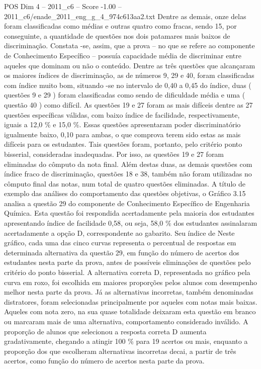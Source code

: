 \begin{textsample}{POS Dim 4 – 2011\_c6 – Score -1.00 – 2011\_c6/enade\_2011\_eng\_g\_4\_974c613aa2.txt}
Dentre as demais, onze delas foram classificadas como médias e outras quatro como fracas, sendo 15, por conseguinte, a quantidade de questões nos dois patamares mais baixos de discriminação.
Constata -se, assim, que a prova – no que se refere ao componente de Conhecimento Específico – possuía capacidade média de discriminar entre aqueles que dominam ou não o conteúdo.
Dentre as três questões que alcançaram os maiores índices de discriminação, as de números 9, 29 e 40, foram classificadas com índice muito bom, situando -se no intervalo de 0,40 a 0,45 do índice, duas ( questões 9 e 29 ) foram classificadas como sendo de dificuldade média e uma ( questão 40 ) como difícil.
As questões 19 e 27 foram as mais difíceis dentre as 27 questões específicas válidas, com baixo índice de facilidade, respectivamente, iguais a 12,0 \% e 15,0 \%.
Essas questões apresentaram poder discriminatório igualmente baixo, 0,10 para ambas, o que comprova terem sido estas as mais difíceis para os estudantes.
Tais questões foram, portanto, pelo critério ponto bisserial, consideradas inadequadas.
Por isso, as questões 19 e 27 foram eliminadas do cômputo da nota final.
Além destas duas, as demais questões com índice fraco de discriminação, questões 18 e 38, também não foram utilizadas no cômputo final das notas, num total de quatro questões eliminadas.
A título de exemplo das análises do comportamento das questões objetivas, o Gráfico 3.15 analisa a questão 29 do componente de Conhecimento Específico de Engenharia Química.
Esta questão foi respondida acertadamente pela maioria dos estudantes apresentando índice de facilidade 0,58, ou seja, 58,0 \% dos estudantes assinalaram acertadamente a opção D, correspondente ao gabarito.
Seu índice de Neste gráfico, cada uma das cinco curvas representa o percentual de respostas em determinada alternativa da questão 29, em função do número de acertos dos estudantes nesta parte da prova, antes de possíveis eliminações de questões pelo critério do ponto bisserial.
A alternativa correta D, representada no gráfico pela curva em roxo, foi escolhida em maiores proporções pelos alunos com desempenho melhor nesta parte da prova.
Já as alternativas incorretas, também denominadas distratores, foram selecionadas principalmente por aqueles com notas mais baixas.
Aqueles com nota zero, na sua quase totalidade deixaram esta questão em branco ou marcaram mais de uma alternativa, comportamento considerado inválido.
A proporção de alunos que selecionou a resposta correta D aumenta gradativamente, chegando a atingir 100 \% para 19 acertos ou mais, enquanto a proporção dos que escolheram alternativas incorretas decai, a partir de três acertos, como função do número de acertos nesta parte da prova.

\end{textsample}

